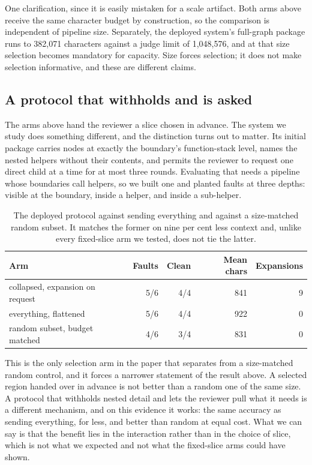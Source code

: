 One clarification, since it is easily mistaken for a scale artifact. Both arms above
receive the same character budget by construction, so the comparison is independent of
pipeline size. Separately, the deployed system's full-graph package runs to 382{,}071
characters against a judge limit of 1{,}048{,}576, and at that size selection becomes
mandatory for capacity. Size forces selection; it does not make selection informative, and
these are different claims.

\subsection{A protocol that withholds and is asked}
\label{sec:collapsed}

The arms above hand the reviewer a slice chosen in advance. The system we study does
something different, and the distinction turns out to matter. Its initial package carries
nodes at exactly the boundary's function-stack level, names the nested helpers without
their contents, and permits the reviewer to request one direct child at a time for at most
three rounds. Evaluating that needs a pipeline whose boundaries call helpers, so we built
one and planted faults at three depths: visible at the boundary, inside a helper, and
inside a sub-helper.

\begin{table}[t]
\centering
\begin{tabular}{lrrrr}
\toprule
Arm & Faults & Clean & Mean chars & Expansions \\
\midrule
collapsed, expansion on request & 5/6 & 4/4 & 841 & 9 \\
everything, flattened           & 5/6 & 4/4 & 922 & 0 \\
random subset, budget matched   & 4/6 & 3/4 & 831 & 0 \\
\bottomrule
\end{tabular}
\caption{The deployed protocol against sending everything and against a size-matched
random subset. It matches the former on nine per cent less context and, unlike every
fixed-slice arm we tested, does not tie the latter.}
\label{tab:collapsed}
\end{table}

This is the only selection arm in the paper that separates from a size-matched random
control, and it forces a narrower statement of the result above. A selected region handed
over in advance is not better than a random one of the same size. A protocol that
withholds nested detail and lets the reviewer pull what it needs is a different mechanism,
and on this evidence it works: the same accuracy as sending everything, for less, and
better than random at equal cost. What we can say is that the benefit lies in the
interaction rather than in the choice of slice, which is not what we expected and not what
the fixed-slice arms could have shown.

